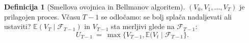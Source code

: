 \documentclass[11pt]{article}
\newcommand{\E}{\mathbb{E}}
\newcommand{\F}{\mathcal{F}}
\newcommand{\1}{\mathbbm{1}}
\theoremstyle{definition}
\newtheorem{definicija}{Definicija}[section]
\theoremstyle{definition}
\begin{document}
\begin{definicija}[Smellova ovojnica in Bellmanov algoritem]

$(V_0, V_1, \ldots, V_T)$ je prilagojen proces. Včasu $T-1$ se odločamo: se bolj splača nadaljevati ali ustaviti? $\E(V_T \mid \F_{T-1})$ in $V_{T-1}$ sta merljivi glede na $\F_{T-1}$:
$$U_{T-1} ~=~ \max\{V_{T-1}, \E(V_t \mid \F_{T-1}\}.$$

\end{definicija}
\vspace{0.5cm}

\pagebreak

\end{document}
